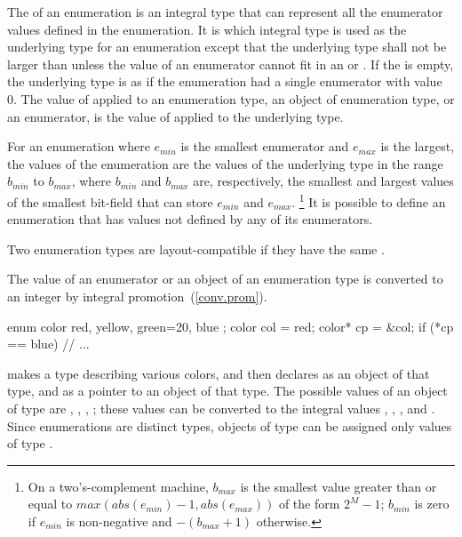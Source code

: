 \pnum
{}%
The  of an enumeration is an integral type that
can represent all the enumerator values defined in the enumeration.
It is 
which integral type is used as the underlying type for an enumeration
except that the underlying type shall not be larger than 
unless the value of an enumerator cannot fit in an  or
. If the  is empty, the
underlying type is as if the enumeration had a single enumerator with
value 0. The value of  applied to an enumeration type,
an object of enumeration type, or an enumerator, is the value of
 applied to the underlying type.

\pnum
For an enumeration where $e_\mathit{min}$ is the smallest enumerator and
$e_\mathit{max}$ is the largest, the values of the enumeration are the
values of the underlying type in the range $b_{min}$ to $b_{max}$, where
$b_{min}$ and $b_{max}$ are, respectively, the smallest and largest values
of the smallest bit-field that can store $e_{min}$ and $e_{max}$.%
\footnote{On a two's-complement machine, $b_{max}$ is the smallest value
greater than or equal to $max(abs(e_{min})-1,abs(e_{max}))$ of the form
$2^M-1$; $b_{min}$ is zero if $e_{min}$ is non-negative and $-(b_{max}+1)$
otherwise.}
It is possible to define an enumeration that has values not defined by
any of its enumerators.

\pnum
{}%
Two enumeration types are layout-compatible if they have the same
.

\pnum
The value of an enumerator or an object of an enumeration type is
converted to an integer by integral promotion~(\ref{conv.prom}).
\enterexample

%
\begin{codeblock}
	enum color { red, yellow, green=20, blue };
	color col = red;
	color* cp = &col;
	if (*cp == blue)        // ...
\end{codeblock}

makes  a type describing various colors, and then declares
 as an object of that type, and  as a pointer to an
object of that type. The possible values of an object of type
 are , , ,
; these values can be converted to the integral values
, , , and . Since enumerations are
distinct types, objects of type  can be assigned only
values of type .

